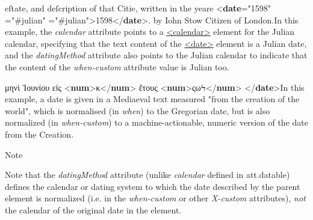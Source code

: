 \begin{reflist}
\begin{sansreflist}
\begin{reflist}
 eſtate, and deſcription of that Citie, written in the yeare\mbox{}\newline 
{<\textbf{date}\hspace*{1em}{when-custom}="{1598}"\mbox{}\newline 
\hspace*{1em}{calendar}="{\#julian}"\mbox{}\newline 
\hspace*{1em}{datingMethod}="{\#julian}">}1598{</\textbf{date}>}. by Iohn Stow\mbox{}\newline 
 Citizen of London.In this example, the {\itshape calendar} attribute points to a \hyperref[TEI.calendar]{<calendar>} element for the Julian calendar, specifying that the text content of the \hyperref[TEI.date]{<date>} element is a Julian date, and the {\itshape datingMethod} attribute also points to the Julian calendar to indicate that the content of the {\itshape when-custom} attribute value is Julian too.
    \item[] μηνὶ Ἰουνίου εἰς {<\textbf{num}>}κ{</\textbf{num}>} ἔτους {<\textbf{num}>}ςωϞ{</\textbf{num}>}\mbox{}\newline 
{</\textbf{date}>}In this example, a date is given in a Mediaeval text measured "from the creation of the world", which is normalised (in {\itshape when}) to the Gregorian date, but is also normalized (in {\itshape when-custom}) to a machine-actionable, numeric version of the date from the Creation.
    \item[{Note}]
  \par
Note that the {\itshape datingMethod} attribute (unlike {\itshape calendar} defined in \textsf{att.datable}) defines the calendar or dating system to which the date described by the parent element is normalized (i.e. in the {\itshape when-custom} or other {\itshape X-custom} attributes), \textit{not} the calendar of the original date in the element.
\end{reflist}  
\end{sansreflist}  
\end{reflist}  
